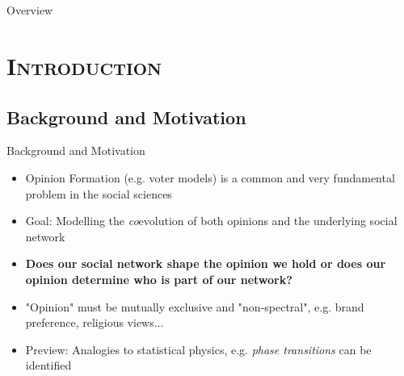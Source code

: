 \documentclass[xcolor=x11names,compress]{beamer}
\renewcommand{\(}{\begin{columns}}
\renewcommand{\)}{\end{columns}}
\newcommand{\<}[1]{\begin{column}{#1}}
\renewcommand{\>}{\end{column}}
\begin{document}
\section{}

\section{}
\begin{frame}{Overview}
\tableofcontents
\end{frame}

\section{\scshape Introduction}
\subsection{Background and Motivation}
\begin{frame}{Background and Motivation}
\begin{itemize}

\item Opinion Formation (e.g. voter models) is a common and very fundamental problem in the social sciences

\item Goal: Modelling the \emph{co}evolution of both opinions and the underlying social network

\item \textbf{Does our social network shape the opinion we hold or does our opinion determine who is part of our network?}
\item "Opinion" must be mutually exclusive and "non-spectral", e.g. brand preference, religious views...

\vspace{0.2in}

\item Preview: Analogies to statistical physics, e.g. \emph{phase transitions} can be identified

\end{itemize}
\end{frame}
\end{document}
